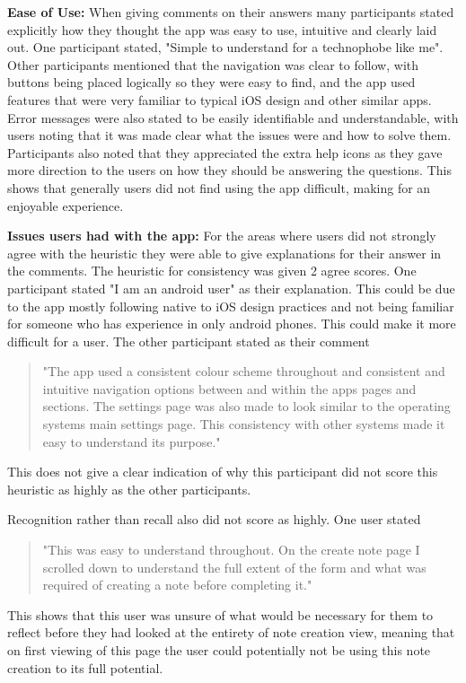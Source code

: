 \documentclass{l4proj}
\begin{document}
\textbf{Ease of Use:} When giving comments on their answers many participants stated explicitly how they thought the app was easy to use, intuitive and clearly laid out. One participant stated, "Simple to understand for a technophobe like me". Other participants mentioned that the navigation was clear to follow, with buttons being placed logically so they were easy to find, and the app used features that were very familiar to typical iOS design and other similar apps. Error messages were also stated to be easily identifiable and understandable, with users noting that it was made clear what the issues were and how to solve them. Participants also noted that they appreciated the extra help icons as they gave more direction to the users on how they should be answering the questions. This shows that generally users did not find using the app difficult, making for an enjoyable experience.

\textbf{Issues users had with the app:} For the areas where users did not strongly agree with the heuristic they were able to give explanations for their answer in the comments. The heuristic for consistency was given 2 agree scores. One participant stated "I am an android user" as their explanation. This could be due to the app mostly following native to iOS design practices and not being familiar for someone who has experience in only android phones. This could make it more difficult for a user. The other participant stated as their comment \begin{quotation}"The app used a consistent colour scheme throughout and consistent and intuitive navigation options between and within the apps pages and sections. The settings page was also made to look similar to the operating systems main settings page. This consistency with other systems made it easy to understand its purpose."\end{quotation} This does not give a clear indication of why this participant did not score this heuristic as highly as the other participants.

Recognition rather than recall also did not score as highly. One user stated \begin{quotation}"This was easy to understand throughout. On the create note page I scrolled down to understand the full extent of the form and what was required of creating a note before completing it."\end{quotation} This shows that this user was unsure of what would be necessary for them to reflect before they had looked at the entirety of note creation view, meaning that on first viewing of this page the user could potentially not be using this note creation to its full potential. 
\end{document}
